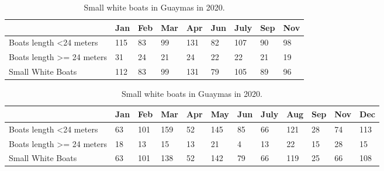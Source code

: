 \begin{table}[h]
\begin{tabular}{|l|l|l|l|l|l|l|l|l|}
\hline
                                       & Jan & Feb & Mar & Apr & Jun & July & Sep & Nov \\ \hline
Boats length \textless 24 meters       & 115 & 83  & 99  & 131 & 82  & 107  & 90  & 98  \\ \hline
Boats length \textgreater{}= 24 meters & 31  & 24  & 21  & 24  & 22  & 22   & 21  & 19  \\ \hline
Small White Boats                      & 112 & 83  & 99  & 131 & 79  & 105  & 89  & 96  \\ \hline
\end{tabular}
\caption{Small white boats in Guaymas in 2019.}


\begin{tabular}{|p{2.4cm}|l|l|l|l|l|l|l|l|l|l|l|}
\hline
                                       & Jan & Feb & Mar & Apr & May & Jun & July & Aug & Sep & Nov & Dec \\ \hline
Boats length \textless 24 meters       & 63  & 101 & 159 & 52  & 145 & 85  & 66   & 121 & 28  & 74  & 113 \\ \hline
Boats length \textgreater{}= 24 meters & 18  & 13  & 15  & 13  & 21  & 4   & 13   & 22  & 15  & 28  & 15  \\ \hline
Small White Boats                      & 63  & 101 & 138 & 52  & 142 & 79  & 66   & 119 & 25  & 66  & 108 \\ \hline
\end{tabular}
\caption{Small white boats in Guaymas in 2020.}
\end{table}


